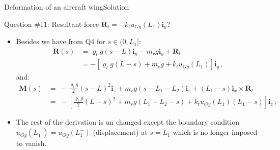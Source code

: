 \documentclass{beamer}
\newcommand{\uj}{u}
\newcommand{\xj}{x}
\newcommand{\yj}{y}
\newcommand{\zj}{z}
\renewcommand{\ij}{i}
\newcommand{\iv}{{\boldsymbol\ij}}
\newcommand{\roi}{\varrho}
\newcommand{\Fresj}{R}
\newcommand{\Mresj}{M}
\newcommand{\Fres}{{\boldsymbol\Fresj}}
\newcommand{\Mres}{{\boldsymbol\Mresj}}
\begin{document}
\begin{frame}{Deformation of an aircraft wing}{Solution}
\begin{overprint}
\vskip-20pt
\begin{exampleblock}{Question \#11: Resultant force $\Fres_t=-k_t\uj_{G\yj}(L_1)\iv_\yj$?}
\begin{itemize}
\item Besides we have from Q4 for $s\in(0,L_1]$:
\begin{displaymath}
\begin{split}
\Fres(s) &= \roi_l g(s-L)\iv_\yj-m_r g\iv_\yj+\Fres_t \\
&=-\left[\roi_l g(L-s) + m_r g + k_t\uj_{G\yj}(L_1)\right]\iv_\yj\,,
\end{split}
\end{displaymath}
and:
\begin{displaymath}
\begin{split}
\Mres(s) &= \scriptstyle\; -\frac{\roi_l g}{2}(s-L)^2\iv_\zj + m_r g(s-L_1-L_2)\iv_\zj +(L_1-s)\iv_\xj\times\Fres_t \\
&= \scriptstyle\; -\left[\frac{\roi_l g}{2}(L-s)^2+ m_r g(L_1+L_2-s) + k_t\uj_{G\yj}(L_1)(L_1-s)\right]\iv_\zj\,; 
\end{split}
\end{displaymath}
\item The rest of the derivation is un changed except the boundary condition $\uj_{G\yj}(L_1^+)=\uj_{G\yj}(L_1^-)$ (displacement) at $s=L_1$ which is no longer imposed to vanish.
\end{itemize}
\end{exampleblock}

\end{overprint}

\end{frame}
\end{document}
